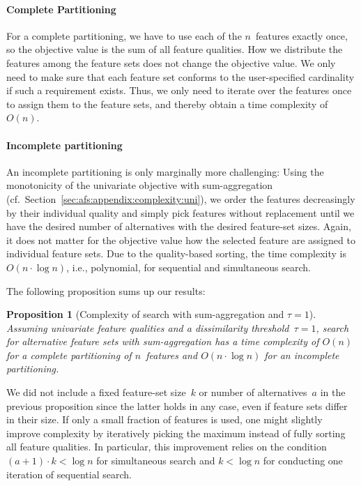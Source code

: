 \documentclass{article}
\newtheorem{proposition}{Proposition}
\theoremstyle{definition}
\begin{document}
\paragraph{Complete Partitioning}

For a complete partitioning, we have to use each of the $n$~features exactly once, so the objective value is the sum of all feature qualities.
How we distribute the features among the feature sets does not change the objective value.
We only need to make sure that each feature set conforms to the user-specified cardinality if such a requirement exists.
Thus, we only need to iterate over the features once to assign them to the feature sets, and thereby obtain a time complexity of $O(n)$.

\paragraph{Incomplete partitioning}

An incomplete partitioning is only marginally more challenging:
Using the monotonicity of the univariate objective with sum-aggregation (cf.~Section~\ref{sec:afs:appendix:complexity:uni}), we order the features decreasingly by their individual quality and simply pick features without replacement until we have the desired number of alternatives with the desired feature-set sizes.
Again, it does not matter for the objective value how the selected feature are assigned to individual feature sets.
Due to the quality-based sorting, the time complexity is~$O(n \cdot \log n)$, i.e., polynomial, for sequential and simultaneous search.

The following proposition sums up our results:
%
\begin{proposition}[Complexity of search with sum-aggregation and $\tau=1$]
	Assuming univariate feature qualities and a dissimilarity threshold~$\tau = 1$, search for alternative feature sets with sum-aggregation has a time complexity of $O(n)$ for a complete partitioning of $n$~features and $O(n \cdot \log n)$ for an incomplete partitioning.
	\label{prop:afs:complexity-partitioning-sum}
\end{proposition}
%
We did not include a fixed feature-set size~$k$ or number of alternatives~$a$ in the previous proposition since the latter holds in any case, even if feature sets differ in their size.
If only a small fraction of features is used, one might slightly improve complexity by iteratively picking the maximum instead of fully sorting all feature qualities.
In particular, this improvement relies on the condition $(a + 1) \cdot k < \log n$ for simultaneous search and $k < \log n$ for conducting one iteration of sequential search.
\end{document}
